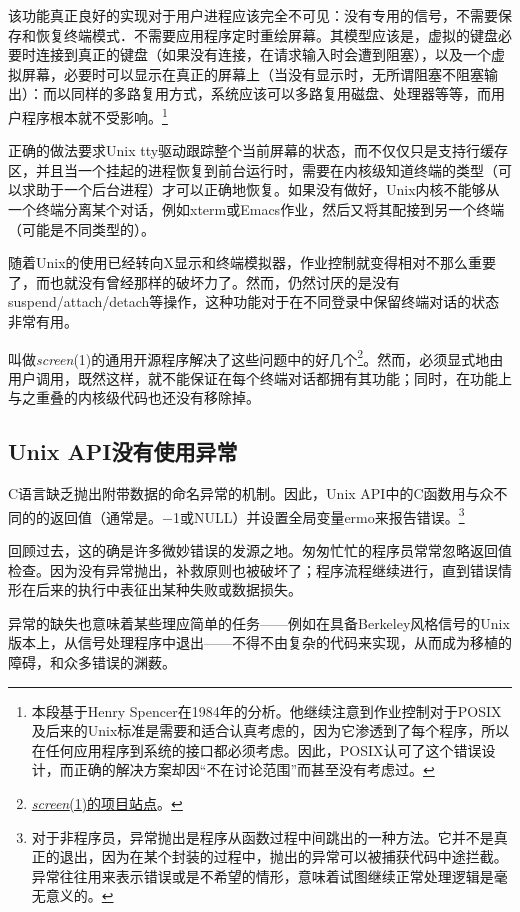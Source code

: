 \documentclass[12pt,oneside]{ctexbook}
\begin{document}
\begin{common-format}
该功能真正良好的实现对于用户进程应该完全不可见：没有专用的信号，不需要保存和恢复终端模式．不需要应用程序定时重绘屏幕。其模型应该是，虚拟的键盘必要时连接到真正的键盘（如果没有连接，在请求输入时会遭到阻塞），以及一个虚拟屏幕，必要时可以显示在真正的屏幕上（当没有显示时，无所谓阻塞不阻塞输出）：而以同样的多路复用方式，系统应该可以多路复用磁盘、处理器等等，而用户程序根本就不受影响。\footnote{本段基于Henry Spencer在1984年的分析。他继续注意到作业控制对于POSIX及后来的Unix标准是需要和适合认真考虑的，因为它渗透到了每个程序，所以在任何应用程序到系统的接口都必须考虑。因此，POSIX认可了这个错误设计，而正确的解决方案却因“不在讨论范围”而甚至没有考虑过。}

正确的做法要求Unix tty驱动跟踪整个当前屏幕的状态，而不仅仅只是支持行缓存区，并且当一个挂起的进程恢复到前台运行时，需要在内核级知道终端的类型（可以求助于一个后台进程）才可以正确地恢复。如果没有做好，Unix内核不能够从一个终端分离某个对话，例如xterm或Emacs作业，然后又将其配接到另一个终端（可能是不同类型的）。

随着Unix的使用已经转向X显示和终端模拟器，作业控制就变得相对不那么重要了，而也就没有曾经那样的破坏力了。然而，仍然讨厌的是没有suspend/attach/detach等操作，这种功能对于在不同登录中保留终端对话的状态非常有用。

叫做\textit{screen}(1)的通用开源程序解决了这些问题中的好几个\footnote{\href{http://www.math.fu-berlin.de/~guckes/screen/}{\textit{screen}(1)的项目站点}。}。然而，必须显式地由用户调用，既然这样，就不能保证在每个终端对话都拥有其功能；同时，在功能上与之重叠的内核级代码也还没有移除掉。

\subsection{Unix API没有使用异常}
C语言缺乏抛出附带数据的命名异常的机制。因此，Unix API中的C函数用与众不同的的返回值（通常是。−1或NULL）并设置全局变量ermo来报告错误。\footnote{对于非程序员，异常抛出是程序从函数过程中间跳出的一种方法。它并不是真正的退出，因为在某个封装的过程中，抛出的异常可以被捕获代码中途拦截。异常往往用来表示错误或是不希望的情形，意味着试图继续正常处理逻辑是毫无意义的。}

回顾过去，这的确是许多微妙错误的发源之地。匆匆忙忙的程序员常常忽略返回值检查。因为没有异常抛出，补救原则也被破坏了；程序流程继续进行，直到错误情形在后来的执行中表征出某种失败或数据损失。

异常的缺失也意味着某些理应简单的任务——例如在具备Berkeley风格信号的Unix版本上，从信号处理程序中退出——不得不由复杂的代码来实现，从而成为移植的障碍，和众多错误的渊薮。


\end{common-format}
\end{document}
